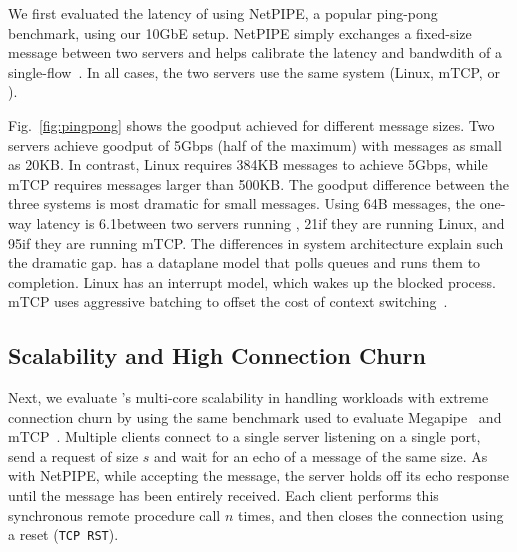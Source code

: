 We first evaluated the latency of \ix using NetPIPE, a popular
ping-pong benchmark, using our 10GbE setup.  NetPIPE simply exchanges
a fixed-size message between two servers and helps calibrate the
latency and bandwdith of a single-flow~\cite{snell1996netpipe}.  In
all cases, the two servers use the same system (Linux, mTCP, or \ix).


Fig.~\ref{fig:pingpong} shows the goodput achieved for
different message sizes.  Two \ix servers achieve goodput of 5Gbps
(half of the maximum) with messages as small as 20KB. In
contrast, Linux requires 384KB messages to achieve 5Gbps, while
mTCP requires messages larger than 500KB. The goodput difference
between the three systems is most dramatic for small messages. Using
64B messages, the one-way latency is 6.1\microsecond between two
servers running \ix, 21\microsecond if they are running Linux, and
95\microsecond if they are running mTCP.  The differences in system
architecture explain such the dramatic gap. \ix has a dataplane model
that polls queues and runs them to completion. Linux has an interrupt
model, which wakes up the blocked process. mTCP uses aggressive
batching to offset the cost of context switching~\cite{jeong2014mtcp}.


\subsection{Scalability and High Connection Churn}
\label{sec:eval:short}

%

Next, we evaluate \ix's multi-core scalability in handling workloads
with extreme connection churn by using the same benchmark used to
evaluate Megapipe~\cite{han2012megapipe} and
mTCP~\cite{jeong2014mtcp}. Multiple clients connect to a single server
listening on a single port, send a request of size $s$ and wait for an
echo of a message of the same size.  As with NetPIPE, while accepting
the message, the server holds off its echo response until the message
has been entirely received.  Each client performs this synchronous
remote procedure call $n$ times, and then closes the connection using a
reset (\texttt{TCP RST}).  


